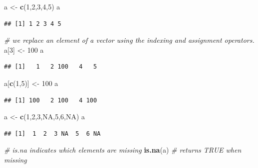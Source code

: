 \documentclass[]{book}
\newenvironment{Shaded}{\begin{snugshade}}{\end{snugshade}}
\newcommand{\CommentTok}[1]{\textcolor[rgb]{0.56,0.35,0.01}{\textit{#1}}}
\newcommand{\DecValTok}[1]{\textcolor[rgb]{0.00,0.00,0.81}{#1}}
\newcommand{\KeywordTok}[1]{\textcolor[rgb]{0.13,0.29,0.53}{\textbf{#1}}}
\newcommand{\NormalTok}[1]{#1}
\newcommand{\OtherTok}[1]{\textcolor[rgb]{0.56,0.35,0.01}{#1}}
\newcommand{\StringTok}[1]{\textcolor[rgb]{0.31,0.60,0.02}{#1}}
\begin{document}
\begin{Shaded}
\begin{Highlighting}[]
\NormalTok{a <-}\StringTok{ }\KeywordTok{c}\NormalTok{(}\DecValTok{1}\NormalTok{,}\DecValTok{2}\NormalTok{,}\DecValTok{3}\NormalTok{,}\DecValTok{4}\NormalTok{,}\DecValTok{5}\NormalTok{)}
\NormalTok{a}
\end{Highlighting}
\end{Shaded}

\begin{verbatim}
## [1] 1 2 3 4 5
\end{verbatim}

\begin{Shaded}
\begin{Highlighting}[]
\CommentTok{# we replace an element of a vector using the indexing and assignment operators. }
\NormalTok{a[}\DecValTok{3}\NormalTok{] <-}\StringTok{ }\DecValTok{100}
\NormalTok{a}
\end{Highlighting}
\end{Shaded}

\begin{verbatim}
## [1]   1   2 100   4   5
\end{verbatim}

\begin{Shaded}
\begin{Highlighting}[]
\NormalTok{a[}\KeywordTok{c}\NormalTok{(}\DecValTok{1}\NormalTok{,}\DecValTok{5}\NormalTok{)] <-}\StringTok{ }\DecValTok{100}
\NormalTok{a}
\end{Highlighting}
\end{Shaded}

\begin{verbatim}
## [1] 100   2 100   4 100
\end{verbatim}

\begin{Shaded}
\begin{Highlighting}[]
\NormalTok{a <-}\StringTok{ }\KeywordTok{c}\NormalTok{(}\DecValTok{1}\NormalTok{,}\DecValTok{2}\NormalTok{,}\DecValTok{3}\NormalTok{,}\OtherTok{NA}\NormalTok{,}\DecValTok{5}\NormalTok{,}\DecValTok{6}\NormalTok{,}\OtherTok{NA}\NormalTok{)}
\NormalTok{a}
\end{Highlighting}
\end{Shaded}

\begin{verbatim}
## [1]  1  2  3 NA  5  6 NA
\end{verbatim}

\begin{Shaded}
\begin{Highlighting}[]
\CommentTok{# is.na indicates which elements are missing}
\KeywordTok{is.na}\NormalTok{(a)  }\CommentTok{# returns TRUE when missing}
\end{Highlighting}
\end{Shaded}
\end{document}
